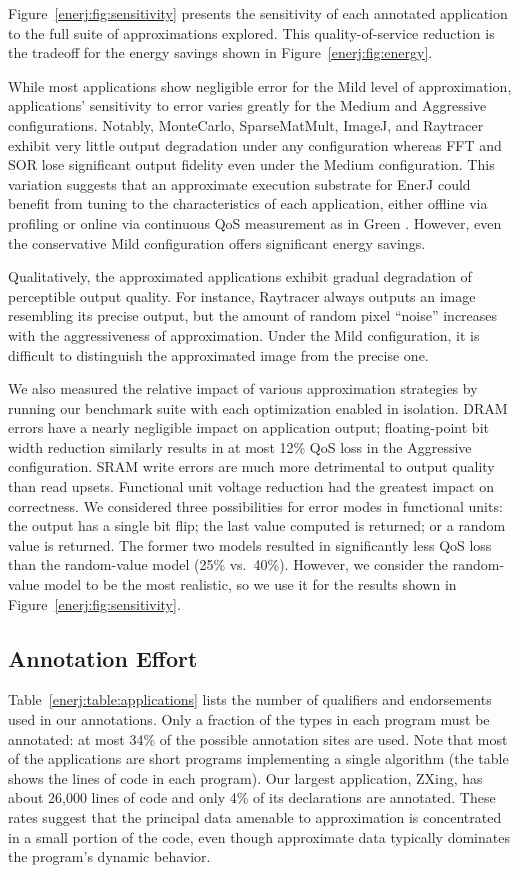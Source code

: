 Figure~\ref{enerj:fig:sensitivity} presents the sensitivity of each
annotated application to the full suite of approximations
explored. This quality-of-service reduction is the tradeoff for the
energy savings shown in Figure~\ref{enerj:fig:energy}.

While most applications show negligible error for the Mild level of
approximation, applications' sensitivity to error varies greatly for the Medium
and Aggressive configurations. Notably, MonteCarlo, SparseMatMult, ImageJ, and
Raytracer exhibit
very little output degradation under any configuration whereas FFT and SOR lose
significant output fidelity even under the Medium configuration.
This variation suggests that an approximate execution substrate for EnerJ
could benefit from tuning to the characteristics of each application,
either offline via profiling or online via continuous QoS measurement
as in Green \cite{green}.
However, even the
conservative Mild configuration offers significant energy savings.

Qualitatively, the approximated applications exhibit gradual degradation of
perceptible output quality. For instance, Raytracer always outputs an image
resembling its precise output, but the amount of random pixel ``noise''
increases with the aggressiveness of approximation. Under the Mild
configuration, it is difficult to distinguish the approximated image from the
precise one.

We also measured the relative impact of various approximation
strategies by running our benchmark suite with each optimization enabled in
isolation. DRAM errors have a nearly negligible impact on application output;
floating-point bit width reduction similarly results in at most 12\% QoS loss
in the Aggressive configuration. SRAM write errors are much more detrimental to
output quality than read upsets. Functional unit voltage reduction had the
greatest impact on correctness. We considered three possibilities for error
modes in
functional units: the output has a single bit flip; the last value computed is
returned; or a random value is returned. The former two models resulted in
significantly less QoS loss than the random-value model (25\% vs.~40\%).
However, we consider the random-value model to be the most realistic, so we use it for
the results shown in Figure~\ref{enerj:fig:sensitivity}.

\subsection{Annotation Effort}
\label{enerj:effort}
Table~\ref{enerj:table:applications} lists the number of qualifiers and
endorsements used in our annotations.
Only a fraction of the types in each program must be annotated: at most 34\% of
the possible annotation sites are used.
Note that most of the applications are short programs implementing a
single algorithm (the table shows the lines of code in
each program). Our largest application, ZXing, has about 26,000 lines
of code and only 4\% of its declarations are annotated.
These rates suggest that the principal data
amenable to approximation is concentrated in a small portion of the code,
even though approximate data typically dominates the program's dynamic behavior.

